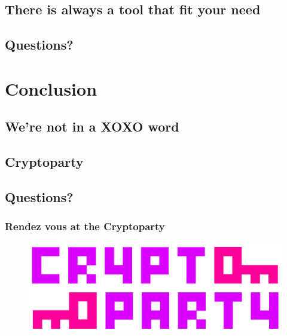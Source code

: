 \documentclass{beamer}
\begin{document}
\subsection{There is always a tool that fit your need}
\subsection{Questions?}


\section{Conclusion}
\subsection{We're not in a XOXO word}



\subsection{Cryptoparty}

\subsection{Questions?}


\begin{frame}
\frametitle{Rendez vous at the Cryptoparty}
\begin{figure}
\includegraphics[width=0.8\linewidth]{./materials/cryptoparty.jpg}
\end{figure}
\end{frame}
\end{document}
